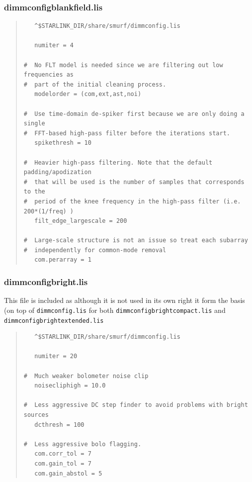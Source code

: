 \documentclass[twoside,11pt]{article}
\renewcommand{\_}{\texttt{\symbol{95}}}
\newenvironment{myquote}{\begin{quote}\begin{small}}{\end{small}\end{quote}}
\begin{document}
\subsubsection{dimmconfig\_blank\_field.lis}
\begin{myquote}
\begin{verbatim}
   ^$STARLINK_DIR/share/smurf/dimmconfig.lis

   numiter = 4

#  No FLT model is needed since we are filtering out low frequencies as
#  part of the initial cleaning process.
   modelorder = (com,ext,ast,noi)

#  Use time-domain de-spiker first because we are only doing a single
#  FFT-based high-pass filter before the iterations start.
   spikethresh = 10

#  Heavier high-pass filtering. Note that the default padding/apodization
#  that will be used is the number of samples that corresponds to the
#  period of the knee frequency in the high-pass filter (i.e. 200*(1/freq) )
   filt_edge_largescale = 200

#  Large-scale structure is not an issue so treat each subarray
#  independently for common-mode removal
   com.perarray = 1

\end{verbatim}
\end{myquote}


\subsubsection{dimmconfig\_bright.lis}

This file is included as although it is not used in its own right it
form the basis (on top of \texttt{dimmconfig.lis} for both
\texttt{dimmconfig\_bright\_compact.lis} and
\texttt{dimmconfig\_bright\_extended.lis}
\begin{myquote}
\begin{verbatim}
   ^$STARLINK_DIR/share/smurf/dimmconfig.lis

   numiter = 20

#  Much weaker bolometer noise clip
   noisecliphigh = 10.0

#  Less aggressive DC step finder to avoid problems with bright sources
   dcthresh = 100

#  Less aggressive bolo flagging.
   com.corr_tol = 7
   com.gain_tol = 7
   com.gain_abstol = 5
\end{verbatim}
\end{myquote}
\end{document}
